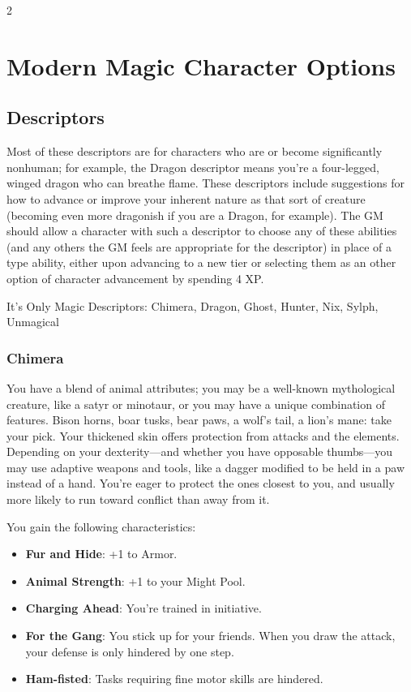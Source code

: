 \begin{multicols}{2}

\chapter{Modern Magic Character Options}

\section{Descriptors}

Most of these descriptors are for characters who are or become significantly nonhuman; for example, the Dragon descriptor means you’re a four-legged, winged dragon who can breathe flame. These descriptors include suggestions for how to advance or improve your inherent nature as that sort of creature (becoming even more dragonish if you are a Dragon, for example). The GM should allow a character with such a descriptor to choose any of these abilities (and any others the GM feels are appropriate for the descriptor) in place of a type ability, either upon advancing to a new tier or selecting them as an other option of character advancement by spending 4 XP.

It’s Only Magic Descriptors: Chimera, Dragon, Ghost, Hunter, Nix, Sylph, Unmagical

\subsection{Chimera}
 
You have a blend of animal attributes; you may be a well-known mythological creature, like a satyr or minotaur, or you may have a unique combination of features. Bison horns, boar tusks, bear paws, a wolf’s tail, a lion’s mane: take your pick. Your thickened skin offers protection from attacks and the elements. Depending on your dexterity—and whether you have opposable thumbs—you may use adaptive weapons and tools, like a dagger modified to be held in a paw instead of a hand. You’re eager to protect the ones closest to you, and usually more likely to run toward conflict than away from it.

You gain the following characteristics:

\begin{itemize}
\item \textbf{Fur and Hide}: +1 to Armor.
\item \textbf{Animal Strength}: +1 to your Might Pool.
\item \textbf{Charging Ahead}: You’re trained in initiative.
\item \textbf{For the Gang}: You stick up for your friends. When you draw the attack, your defense is only hindered by one step.
\item \textbf{Ham-fisted}: Tasks requiring fine motor skills are hindered.
\end{itemize}


\end{multicols}
